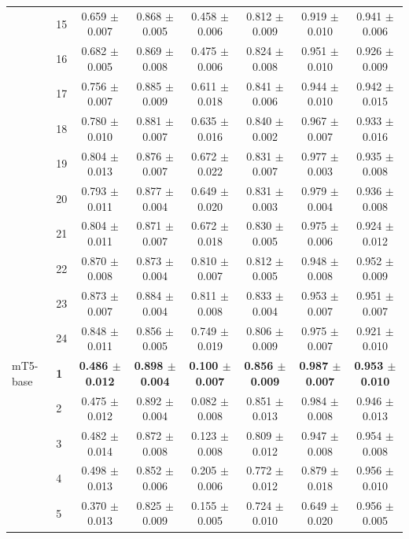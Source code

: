 \begin{longtable}{llcccccc}
 & 15 & 0.659 $\pm$ 0.007 & 0.868 $\pm$ 0.005 & 0.458 $\pm$ 0.006 & 0.812 $\pm$ 0.009 & 0.919 $\pm$ 0.010 & 0.941 $\pm$ 0.006 \\
 & 16 & 0.682 $\pm$ 0.005 & 0.869 $\pm$ 0.008 & 0.475 $\pm$ 0.006 & 0.824 $\pm$ 0.008 & 0.951 $\pm$ 0.010 & 0.926 $\pm$ 0.009 \\
 & 17 & 0.756 $\pm$ 0.007 & 0.885 $\pm$ 0.009 & 0.611 $\pm$ 0.018 & 0.841 $\pm$ 0.006 & 0.944 $\pm$ 0.010 & 0.942 $\pm$ 0.015 \\
 & 18 & 0.780 $\pm$ 0.010 & 0.881 $\pm$ 0.007 & 0.635 $\pm$ 0.016 & 0.840 $\pm$ 0.002 & 0.967 $\pm$ 0.007 & 0.933 $\pm$ 0.016 \\
 & 19 & 0.804 $\pm$ 0.013 & 0.876 $\pm$ 0.007 & 0.672 $\pm$ 0.022 & 0.831 $\pm$ 0.007 & 0.977 $\pm$ 0.003 & 0.935 $\pm$ 0.008 \\
 & 20 & 0.793 $\pm$ 0.011 & 0.877 $\pm$ 0.004 & 0.649 $\pm$ 0.020 & 0.831 $\pm$ 0.003 & 0.979 $\pm$ 0.004 & 0.936 $\pm$ 0.008 \\
 & 21 & 0.804 $\pm$ 0.011 & 0.871 $\pm$ 0.007 & 0.672 $\pm$ 0.018 & 0.830 $\pm$ 0.005 & 0.975 $\pm$ 0.006 & 0.924 $\pm$ 0.012 \\
 & 22 & 0.870 $\pm$ 0.008 & 0.873 $\pm$ 0.004 & 0.810 $\pm$ 0.007 & 0.812 $\pm$ 0.005 & 0.948 $\pm$ 0.008 & 0.952 $\pm$ 0.009 \\
 & 23 & 0.873 $\pm$ 0.007 & 0.884 $\pm$ 0.004 & 0.811 $\pm$ 0.008 & 0.833 $\pm$ 0.004 & 0.953 $\pm$ 0.007 & 0.951 $\pm$ 0.007 \\
 & 24 & 0.848 $\pm$ 0.011 & 0.856 $\pm$ 0.005 & 0.749 $\pm$ 0.019 & 0.806 $\pm$ 0.009 & 0.975 $\pm$ 0.007 & 0.921 $\pm$ 0.010 \\
\midrule
mT5-base & \textbf{1} & \textbf{0.486 $\pm$ 0.012} & \textbf{0.898 $\pm$ 0.004} & \textbf{0.100 $\pm$ 0.007} & \textbf{0.856 $\pm$ 0.009} & \textbf{0.987 $\pm$ 0.007} & \textbf{0.953 $\pm$ 0.010} \\
 & 2 & 0.475 $\pm$ 0.012 & 0.892 $\pm$ 0.004 & 0.082 $\pm$ 0.008 & 0.851 $\pm$ 0.013 & 0.984 $\pm$ 0.008 & 0.946 $\pm$ 0.013 \\
 & 3 & 0.482 $\pm$ 0.014 & 0.872 $\pm$ 0.008 & 0.123 $\pm$ 0.008 & 0.809 $\pm$ 0.012 & 0.947 $\pm$ 0.008 & 0.954 $\pm$ 0.008 \\
 & 4 & 0.498 $\pm$ 0.013 & 0.852 $\pm$ 0.006 & 0.205 $\pm$ 0.006 & 0.772 $\pm$ 0.012 & 0.879 $\pm$ 0.018 & 0.956 $\pm$ 0.010 \\
 & 5 & 0.370 $\pm$ 0.013 & 0.825 $\pm$ 0.009 & 0.155 $\pm$ 0.005 & 0.724 $\pm$ 0.010 & 0.649 $\pm$ 0.020 & 0.956 $\pm$ 0.005 \\

\end{longtable}
